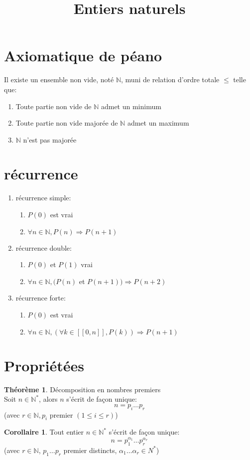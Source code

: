 \documentclass[fleqn]{article}
\title{Entiers naturels}
\date{}
\theoremstyle{definition} \newtheorem*{defi}{D\'efinition}
\theoremstyle{definition} \newtheorem*{theo}{Th\'eor\`eme}
\theoremstyle{definition} \newtheorem*{coro}{Corollaire}
\theoremstyle{remark} \newtheorem*{rqs}{Remarques}
\theoremstyle{definition} \newtheorem*{prop}{Propri\'et\'e}
\begin{document}
\maketitle

\section{Axiomatique de p\'eano}
Il existe un ensemble non vide, not\'e $\mathbb{N}$, muni de relation d'ordre totale $\leq$ telle que:
\begin{enumerate}
	\item Toute partie non vide de $\mathbb{N}$ admet un minimum
	\item Toute partie non vide major\'ee de $\mathbb{N}$ admet un maximum
	\item $\mathbb{N}$ n'est pas major\'ee
\end{enumerate}

\section{r\'ecurrence}
\begin{enumerate}
	\item r\'ecurrence simple:
		\begin{enumerate}
			\item $P(0)$ est vrai
			\item $\forall n \in \mathbb{N}, P(n) \Rightarrow P(n+1)$
		\end{enumerate}
	\item r\'ecurrence double:
		\begin{enumerate}
			\item $P(0)$ et $P(1)$ vrai
			\item $\forall n \in \mathbb{N}, (P(n)$ et $P(n+1)) \Rightarrow P(n+2)$
		\end{enumerate}
	\item r\'ecurrence forte:
		\begin{enumerate}
			\item $P(0)$ est vrai
			\item $\forall n \in \mathbb{N}, (\forall k \in [\![0,n]\!], P(k)) \Rightarrow P(n+1)$
		\end{enumerate}
\end{enumerate}

\section{Propri\'et\'ees}
\begin{theo} D\'ecomposition en nombres premiers \\
		Soit $n \in \mathbb{N}^*$, alors $n$ s'\'ecrit de fa\c{c}on unique:
		\[n = p_i \ldots p_r\] (avec $r \in \mathbb{N}, p_i$ premier $(1 \leq i \leq r)$)
\end{theo}
\begin{coro}
	Tout entier $n \in \mathbb{N}^*$ s'\'ecrit de fa\c{c}on unique:
	\[n = p_1^{\alpha_1} \ldots p_r^{\alpha_r}\] (avec $r \in \mathbb{N}$,
	$p_1 \ldots p_r$ premier distincts, $\alpha_1 \ldots \alpha_r \in {N}^*$)
\end{coro}
\end{document}
